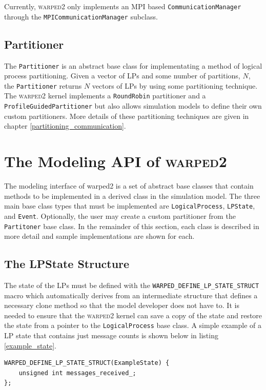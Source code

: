 \documentclass[11pt]{book}
\begin{document}
Currently, \textsc{warped2} only implements an MPI based \texttt{CommunicationManager} through
the \texttt{MPICommunicationManager} subclass.

\subsection{Partitioner}

The \texttt{Partitioner} is an abstract base class for implementating a method of logical
process partitioning. Given a vector of LPs and some number of partitions, $N$, the \texttt{Partitioner}
returns $N$ vectors of LPs by using some partitioning technique. The \textsc{warped2} kernel
implements a \texttt{RoundRobin} partitioner and a \texttt{ProfileGuidedPartitioner} but also
allows simulation models to define their own custom partitioners. More details of these
partitioning techniques are given in chapter \ref{partitioning_communication}.

\section{The Modeling API of \textsc{warped2}}

The modeling interface of warped2 is a set of abstract base classes that contain methods
to be implemented in a derived class in the simulation model. The three main base class
types that must be implemented are \texttt{LogicalProcess}, \texttt{LPState}, and \texttt{Event}.
Optionally, the user may create a custom partitioner from the \texttt{Partitoner} base class.
In the remainder of this section, each class is described in more detail and sample implementations
are shown for each.

\subsection{The LPState Structure}

The state of the LPs must be defined with the \texttt{WARPED\_DEFINE\_LP\_STATE\_STRUCT}
macro which automatically derives from an intermediate structure that defines a necessary
clone method so that the model developer does not have to. It is needed to ensure that the \textsc{warped2}
kernel can save a copy of the state and restore the state from a pointer to the \texttt{LogicalProcess}
base class. A simple example of a LP state that contains just message counts is shown below in
listing \ref{example_state}.

\begin{lstlisting}[caption=Example \textsc{warped2} State Definition, label=example_state, float]
WARPED_DEFINE_LP_STATE_STRUCT(ExampleState) {
    unsigned int messages_received_;
};
\end{lstlisting}
\end{document}
